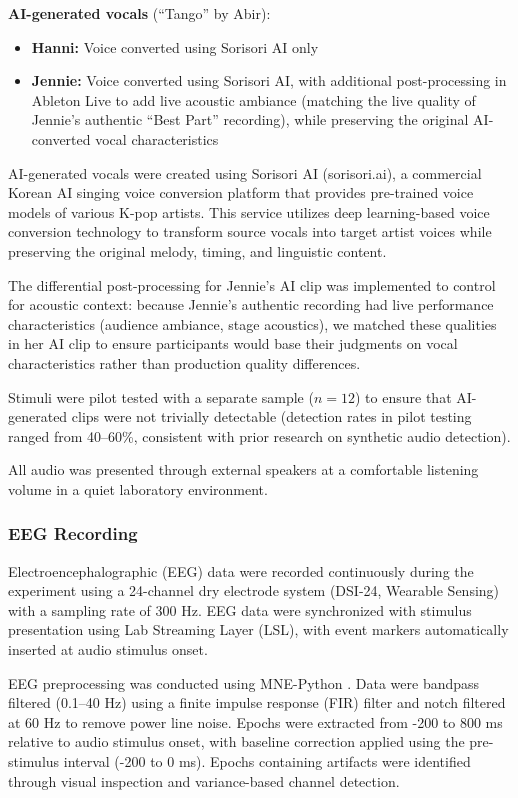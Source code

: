 \documentclass[12pt, a4paper]{article}
\begin{document}
\textbf{AI-generated vocals} (``Tango'' by Abir):
\begin{itemize}
    \item \textbf{Hanni:} Voice converted using Sorisori AI only
    \item \textbf{Jennie:} Voice converted using Sorisori AI, with additional post-processing in Ableton Live to add live acoustic ambiance (matching the live quality of Jennie's authentic ``Best Part'' recording), while preserving the original AI-converted vocal characteristics
\end{itemize}

AI-generated vocals were created using Sorisori AI (sorisori.ai), a commercial Korean AI singing voice conversion platform that provides pre-trained voice models of various K-pop artists. This service utilizes deep learning-based voice conversion technology to transform source vocals into target artist voices while preserving the original melody, timing, and linguistic content.

The differential post-processing for Jennie's AI clip was implemented to control for acoustic context: because Jennie's authentic recording had live performance characteristics (audience ambiance, stage acoustics), we matched these qualities in her AI clip to ensure participants would base their judgments on vocal characteristics rather than production quality differences.

Stimuli were pilot tested with a separate sample ($n = 12$) to ensure that AI-generated clips were not trivially detectable (detection rates in pilot testing ranged from 40--60\%, consistent with prior research on synthetic audio detection).

All audio was presented through external speakers at a comfortable listening volume in a quiet laboratory environment.

\subsubsection{EEG Recording}

Electroencephalographic (EEG) data were recorded continuously during the experiment using a 24-channel dry electrode system (DSI-24, Wearable Sensing) with a sampling rate of 300 Hz. EEG data were synchronized with stimulus presentation using Lab Streaming Layer (LSL), with event markers automatically inserted at audio stimulus onset.

EEG preprocessing was conducted using MNE-Python \citep{gramfort2013meg}. Data were bandpass filtered (0.1--40 Hz) using a finite impulse response (FIR) filter and notch filtered at 60 Hz to remove power line noise. Epochs were extracted from -200 to 800 ms relative to audio stimulus onset, with baseline correction applied using the pre-stimulus interval (-200 to 0 ms). Epochs containing artifacts were identified through visual inspection and variance-based channel detection.
\end{document}
